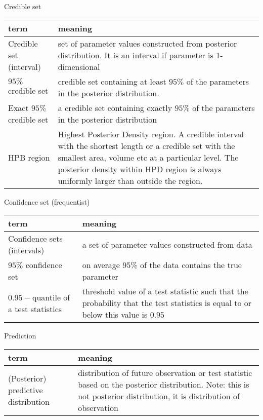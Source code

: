     Credible set\\
    \begin{tabulary}{\linewidth}{l L}
        \hline
        term & meaning\\
        \hline
        \hline
        Credible set (interval) & set of parameter values
        constructed from posterior distribution. It is an
        interval if parameter is 1-dimensional\\
        $95\%$ credible set & credible set containing at
        least $95\%$ of the parameters in the posterior
        distribution.\\
        Exact $95\%$ credible set & a credible set
        containing exactly $95\%$ of the parameters in the
        posterior distribution\\
        HPB region & Highest Posterior Density region. A
        credible interval with the shortest length or a
        credible set with the smallest area, volume etc at a
        particular level. The posterior density within HPD
        region is always uniformly larger than outside the
        region.
    \end{tabulary}

    Confidence set (frequentist)\\
    \begin{tabulary}{\linewidth}{L L}
        \hline
        term & meaning\\
        \hline
        \hline
        Confidence sets (intervals) & a set of parameter
        values constructed from data\\
        $95\%$ confidence set & on average 95\% of the data
        contains the true parameter\\
        $0.95-$quantile of a test statistics & threshold
        value of a test statistic such that the probability
        that the test statistics is equal to or below this
        value is $0.95$\\
    \end{tabulary}

    Prediction\\
    \begin{tabulary}{\linewidth}{L L}
        \hline
        term & meaning\\
        \hline
        \hline
        (Posterior) predictive distribution & distribution
        of future observation or test statistic based on
        the posterior distribution. Note: this is not
        posterior distribution, it is distribution of
        observation\\
    \end{tabulary}


